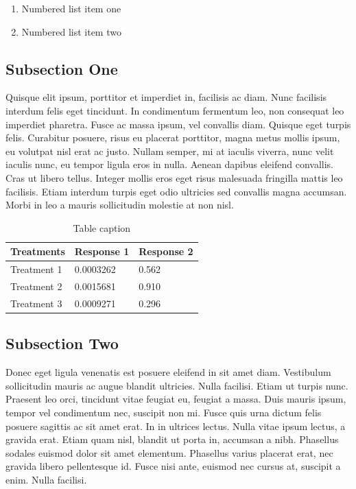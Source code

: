 \documentclass[preprint,12pt]{elsarticle}
\begin{document}
\begin{enumerate}
\item Numbered list item one
\item Numbered list item two
\end{enumerate}

\subsection{Subsection One}

Quisque elit ipsum, porttitor et imperdiet in, facilisis ac diam. Nunc facilisis interdum felis eget tincidunt. In condimentum fermentum leo, non consequat leo imperdiet pharetra. Fusce ac massa ipsum, vel convallis diam. Quisque eget turpis felis. Curabitur posuere, risus eu placerat porttitor, magna metus mollis ipsum, eu volutpat nisl erat ac justo. Nullam semper, mi at iaculis viverra, nunc velit iaculis nunc, eu tempor ligula eros in nulla. Aenean dapibus eleifend convallis. Cras ut libero tellus. Integer mollis eros eget risus malesuada fringilla mattis leo facilisis. Etiam interdum turpis eget odio ultricies sed convallis magna accumsan. Morbi in leo a mauris sollicitudin molestie at non nisl.

\begin{table}[h]
\centering
\begin{tabular}{l l l}
\hline
\textbf{Treatments} & \textbf{Response 1} & \textbf{Response 2}\\
\hline
Treatment 1 & 0.0003262 & 0.562 \\
Treatment 2 & 0.0015681 & 0.910 \\
Treatment 3 & 0.0009271 & 0.296 \\
\hline
\end{tabular}
\caption{Table caption}
\end{table}

\subsection{Subsection Two}

Donec eget ligula venenatis est posuere eleifend in sit amet diam. Vestibulum sollicitudin mauris ac augue blandit ultricies. Nulla facilisi. Etiam ut turpis nunc. Praesent leo orci, tincidunt vitae feugiat eu, feugiat a massa. Duis mauris ipsum, tempor vel condimentum nec, suscipit non mi. Fusce quis urna dictum felis posuere sagittis ac sit amet erat. In in ultrices lectus. Nulla vitae ipsum lectus, a gravida erat. Etiam quam nisl, blandit ut porta in, accumsan a nibh. Phasellus sodales euismod dolor sit amet elementum. Phasellus varius placerat erat, nec gravida libero pellentesque id. Fusce nisi ante, euismod nec cursus at, suscipit a enim. Nulla facilisi.
\end{document}
